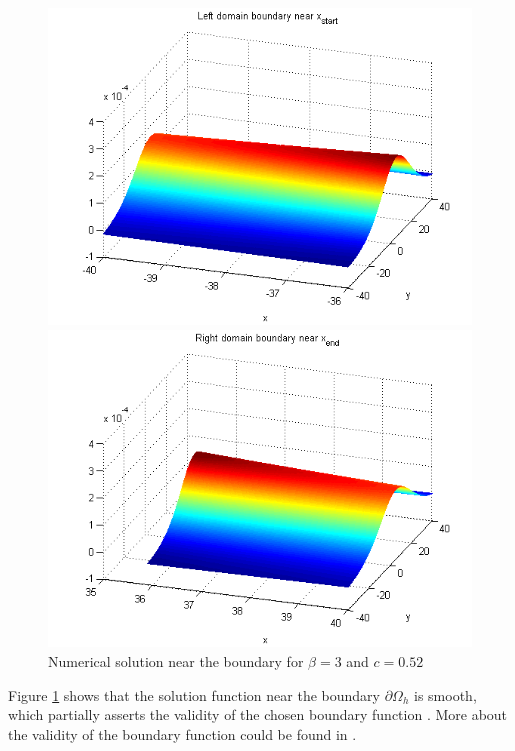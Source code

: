 \documentclass[11pt,a4paper,twoside]{article}
\begin{document}
\begin{figure}[ht]
\begin{minipage}[b]{0.5\linewidth}
		\includegraphics[width=\linewidth]{Pictures/LeftBoundary.png}
	\end{minipage}	
	\begin{minipage}[b]{0.5\linewidth}
		\raggedright
		 \includegraphics[width=\linewidth]{Pictures/RightBoundary.png}
	\end{minipage}
	\caption{Numerical solution near the boundary for $\beta=3$ and $c = 0.52$}
	\label{fig:boundary}
\end{figure}
Figure \ref{fig:boundary} shows that the solution function near the boundary $\partial \Omega_h$ is smooth, which partially asserts the validity of the chosen boundary function . More about the validity of the boundary function could be found in \cite{BoundaryProblem}.
\end{document}
